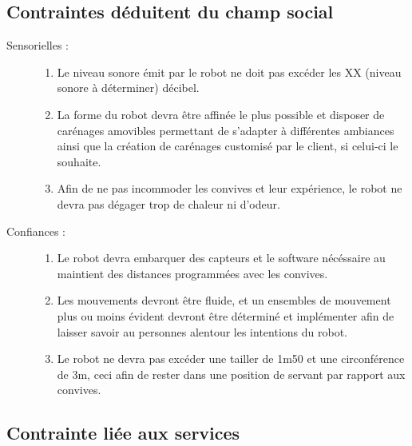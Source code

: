 \subsection{Contraintes déduitent du champ social}


\begin{description}
\item[Sensorielles :]
  \begin{enumerate}
  \item Le niveau sonore émit par le robot ne doit pas excéder les XX (niveau sonore à déterminer) décibel.
  \item La forme du robot devra être affinée le plus possible et disposer de carénages amovibles permettant de s'adapter à différentes ambiances ainsi que la création de carénages customisé par le client, si celui-ci le souhaite.
  \item Afin de ne pas incommoder les convives et leur expérience, le robot ne devra pas dégager trop de chaleur ni d'odeur.
  \end{enumerate}
\item[Confiances :]
  \begin{enumerate}
  \item Le robot devra embarquer des capteurs et le software nécéssaire au maintient des distances programmées avec les convives.
  \item Les mouvements devront être fluide, et un ensembles de mouvement plus ou moins évident devront être déterminé et implémenter afin de laisser savoir au personnes alentour les intentions du robot.
  \item Le robot ne devra pas excéder une tailler de 1m50 et une circonférence de 3m, ceci afin de rester dans une position de servant par rapport aux convives.
  \end{enumerate}
\end{description}


\subsection{Contrainte liée aux services}


